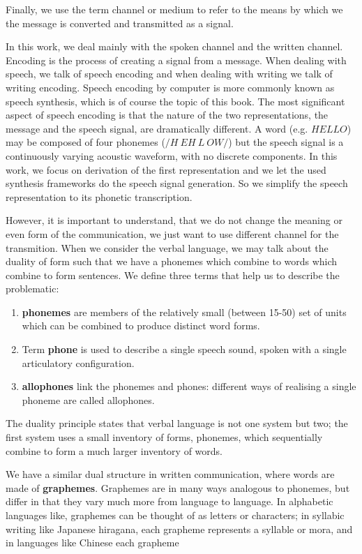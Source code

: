 Finally, we use the term channel or medium to refer to the means by which we the message
is converted and transmitted as a signal.
\par
In this work, we deal mainly with the spoken channel and the written channel.
Encoding is the process of creating a signal from a message. When dealing with speech, we talk
of speech encoding and when dealing with writing we talk of writing encoding. Speech encoding
by computer is more commonly known as speech synthesis, which is of course the topic of this
book.
The most significant aspect of speech encoding is that the nature of the two representations,
the message and the speech signal, are dramatically different.
A word (e.g. $HELLO$) may be composed of four phonemes ($/H\:EH\:L\:OW/$) but the speech signal is a continuously varying acoustic waveform, with no discrete components.
In this work, we focus on derivation of the first representation and we let the used synthesis frameworks do the speech signal generation.
So we simplify the speech representation to its phonetic transcription.
\par
However, it is important to understand, that we do not change the meaning or even form of the communication, we just want to use different channel for the transmition.
When we consider the verbal language, we may talk about the duality of form such that we have a phonemes which combine to words which combine to form sentences.
We define three terms that help us to describe the problematic:
\begin{enumerate}
\item \textbf{phonemes} are members of the relatively small (between 15-50) set of units which can be combined to produce distinct word forms.
\item Term \textbf{phone} is used to describe a single speech sound, spoken with a single articulatory configuration.
\item \textbf{allophones} link the phonemes and phones: different ways of realising a single phoneme are called allophones.
\end{enumerate}
The duality principle states that verbal language is not one system but two; the first system uses a
small inventory of forms, phonemes, which sequentially combine to form a much larger inventory
of words.
\par
We have a similar dual structure in written communication, where words are made of \textbf{graphemes}.
Graphemes are in many ways analogous to phonemes, but differ in that they vary much more from language to language. In alphabetic languages like, graphemes can be thought of as letters or characters; in syllabic writing like Japanese hiragana, each grapheme represents a syllable or mora, and in languages like Chinese each grapheme
